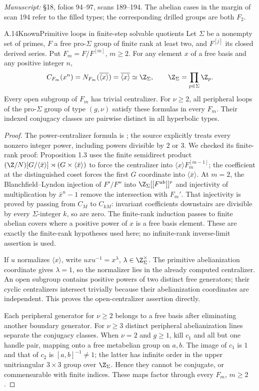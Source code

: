 \noindent\emph{Manuscript:} \S18, folios 94--97, scans 189--194. The abelian cases in the margin of scan 194 refer to the filled types; the corresponding drilled groups are both $F_2$.

\begin{claim}{A.14}{Known}{Primitive loops in finite-step solvable quotients}
Let $\Sigma$ be a nonempty set of primes, $F$ a free pro-$\Sigma$ group of finite rank at least two, and $F^{[j]}$ its closed derived series. Put $F_m=F/F^{[m]}$, $m\ge2$. For any element $x$ of a free basis and any positive integer $n$,
\[
 C_{F_m}(x^n)=N_{F_m}(\overline{\langle x\rangle})
 =\overline{\langle x\rangle}\simeq\Z_\Sigma,
 \qquad \Z_\Sigma=\prod_{p\in\Sigma}\Z_p.
\]
Every open subgroup of $F_m$ has trivial centralizer. For $\nu\ge2$, all peripheral loops of the pro-$\Sigma$ group of type $(g,\nu)$ satisfy these formulas in every $F_m$. Their indexed conjugacy classes are pairwise distinct in all hyperbolic types.
\end{claim}
\begin{proof}
The power-centralizer formula is \cite[Theorem 1.5, finite-rank case]{A_Yamaguchi2026}; the source explicitly treats every nonzero integer power, including powers divisible by $2$ or $3$. We checked its finite-rank proof: Proposition 1.3 uses the finite semidirect product $(\Z/N)[G/\langle\bar x\rangle]\rtimes(G\times\langle\bar x\rangle)$ to force the centralizer into $\langle x\rangle F_m^{[m-1]}$; the coefficient at the distinguished coset forces the first $G$ coordinate into $\langle\bar x\rangle$. At $m=2$, the Blanchfield--Lyndon injection of $F'/F''$ into $\Z_\Sigma[[F^{\mathrm{ab}}]]^r$ and injectivity of multiplication by $\bar x^n-1$ remove the intersection with $F_m'$. That injectivity is proved by passing from $C_M$ to $C_{kM}$: invariant coefficients downstairs are divisible by every $\Sigma$-integer $k$, so are zero. The finite-rank induction passes to finite abelian covers where a positive power of $x$ is a free basis element. These are exactly the finite-rank hypotheses used here; no infinite-rank inverse-limit assertion is used.

If $u$ normalizes $\langle x\rangle$, write $uxu^{-1}=x^\lambda$, $\lambda\in\Z_\Sigma^\times$. The primitive abelianization coordinate gives $\lambda=1$, so the normalizer lies in the already computed centralizer. An open subgroup contains positive powers of two distinct free generators; their cyclic centralizers intersect trivially because their abelianization coordinates are independent. This proves the open-centralizer assertion directly.

Each peripheral generator for $\nu\ge2$ belongs to a free basis after eliminating another boundary generator. For $\nu\ge3$ distinct peripheral abelianization lines separate the conjugacy classes. When $\nu=2$ and $g\ge1$, kill $c_1$ and all but one handle pair, mapping onto a free metabelian group on $a,b$. The image of $c_1$ is $1$ and that of $c_2$ is $[a,b]^{-1}\ne1$; the latter has infinite order in the upper unitriangular $3\times3$ group over $\Z_\Sigma$. Hence they cannot be conjugate, or commensurable with finite indices. These maps factor through every $F_m$, $m\ge2$.
\end{proof}

